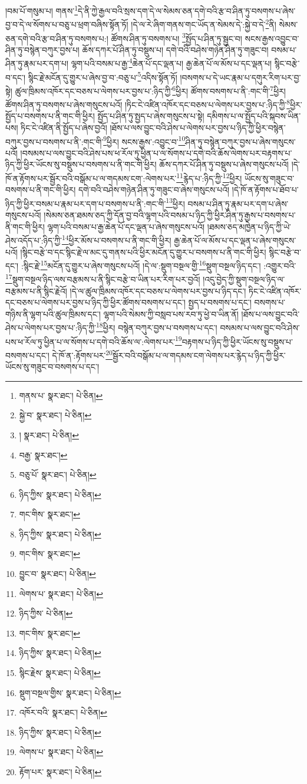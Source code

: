 །བམ་པོ་གསུམ་པ། གནས་\footnote{གནས་པ་  སྣར་ཐང་།  པེ་ཅིན། }དེ་ནི་ཀྱེ་རྒྱལ་བའི་སྲས་དག་དེ་ལ་སེམས་ཅན་དགེ་བའི་རྩ་བ་ཤིན་ཏུ་བསགས་པ་ཞེས་བྱ་བ་དེ་ལ་སོགས་པ་བཅུ་པ་ཕྲག་བཞིས་སྟོན་ཏོ། །དེ་ལ་རེ་ཞིག་གནས་གང་ཡོད་ན་སེམས་དེ་:སྐྱེ་བ་དེ་\footnote{སྐྱེ་བ་  སྣར་ཐང་།  པེ་ཅིན། }ནི། སེམས་ཅན་དགེ་བའི་རྩ་བ་ཤིན་ཏུ་བསགས་པ:། ཚོགས་ཤིན་ཏུ་བསགས་པ། \footnote{།    སྣར་ཐང་།  པེ་ཅིན། }སྤྱོད་པ་ཤིན་ཏུ་སྦྱང་བ། སངས་རྒྱས་འབྱུང་བ་ཤིན་ཏུ་བསྙེན་བཀུར་བྱས་པ། ཆོས་དཀར་པོ་ཤིན་ཏུ་བསྡུས་པ། དགེ་བའི་བཤེས་གཉེན་ཤིན་ཏུ་གཟུང་བ། བསམ་པ་ཤིན་ཏུ་རྣམ་པར་དག་པ། ལྷག་པའི་བསམ་པ་རྒྱ་\footnote{བརྒྱ་  སྣར་ཐང་། }ཆེན་པོ་དང་ལྡན་པ། རྒྱ་ཆེན་པོ་ལ་མོས་པ་དང་ལྡན་པ། སྙིང་བརྩེ་བ་དང་། སྙིང་རྗེ་མངོན་དུ་གྱུར་པ་ཞེས་བྱ་བ་:བཅུ་པ་\footnote{བཅུ་པོ་  སྣར་ཐང་།  པེ་ཅིན། }འདིས་སྟོན་ཏོ། །བསགས་པ་དེ་ཡང་རྣམ་པ་དགུར་རིག་པར་བྱ་སྟེ། ཚུལ་ཁྲིམས་འཁོར་དང་བཅས་པ་ལེགས་པར་བྱས་པ་:ཉིད་ཀྱི་\footnote{ཉིད་ཀྱིས་  སྣར་ཐང་།  པེ་ཅིན། }ཕྱིར། ཚོགས་བསགས་པ་ནི་:གང་གི་\footnote{གང་གིས་  སྣར་ཐང་། }ཕྱིར། ཚོགས་ཤིན་ཏུ་བསགས་པ་ཞེས་གསུངས་པའོ། །ཏིང་ངེ་འཛིན་འཁོར་དང་བཅས་པ་ལེགས་པར་བྱས་པ་:ཉིད་ཀྱི་\footnote{ཉིད་ཀྱིས་  སྣར་ཐང་།  པེ་ཅིན། }ཕྱིར་སྤྱོད་པ་བསགས་པ་ནི་གང་གི་ཕྱིར། སྤྱོད་པ་ཤིན་ཏུ་སྤྱད་པ་ཞེས་གསུངས་པ་སྟེ། དམིགས་པ་ལ་སྤྱོད་པའི་སྐབས་ཡིན་པས། ཏིང་ངེ་འཛིན་ནི་སྤྱོད་པ་ཞེས་བྱའོ། །ཐོས་པ་ལས་བྱུང་བའི་ཤེས་པ་ལེགས་པར་བྱས་པ་ཉིད་ཀྱི་ཕྱིར་བསྙེན་བཀུར་བྱས་པ་བསགས་པ་ནི་:གང་གི་\footnote{གང་གིས་  སྣར་ཐང་། }ཕྱིར། སངས་རྒྱས་:འབྱུང་བ་\footnote{བྱུང་བ་  སྣར་ཐང་།  པེ་ཅིན། }ཤིན་ཏུ་བསྙེན་བཀུར་བྱས་པ་ཞེས་གསུངས་པའོ། །བསམས་པ་ལས་བྱུང་བའི་ཤེས་པས་ཕ་རོལ་ཏུ་ཕྱིན་པ་ལ་སོགས་པ་དགེ་བའི་ཆོས་ལེགས་པར་བརྟགས་པ་ཉིད་ཀྱི་ཕྱིར་ཡོངས་སུ་བསྡུས་པ་བསགས་པ་ནི་གང་གི་ཕྱིར། ཆོས་དཀར་པོ་ཤིན་ཏུ་བསྡུས་པ་ཞེས་གསུངས་པའོ། །དེ་ཁོ་ན་རྟོགས་པར་སྦྱོར་བའི་བསྒོམ་པ་ལ་གདམས་ངག་:ལེགས་པར་\footnote{ལེགས་པ་  སྣར་ཐང་།  པེ་ཅིན། }རྙེད་པ་:ཉིད་ཀྱི་\footnote{ཉིད་ཀྱིས་  པེ་ཅིན། }ཕྱིར། ཡོངས་སུ་གཟུང་བ་བསགས་པ་ནི་གང་གི་ཕྱིར། དགེ་བའི་བཤེས་གཉེན་ཤིན་ཏུ་གཟུང་བ་ཞེས་གསུངས་པའོ། །དེ་ཁོ་ན་རྟོགས་པ་ཐོབ་པ་ཉིད་ཀྱི་ཕྱིར་བསམ་པ་རྣམ་པར་དག་པ་བསགས་པ་ནི་:གང་གི་\footnote{གང་གིས་  སྣར་ཐང་། }ཕྱིར། བསམ་པ་ཤིན་ཏུ་རྣམ་པར་དག་པ་ཞེས་གསུངས་པའོ། །སེམས་ཅན་ཐམས་ཅད་ཀྱི་དོན་བྱ་བའི་ལྷག་པའི་བསམ་པ་ཉིད་ཀྱི་ཕྱིར་ཤིན་ཏུ་རྒྱས་པ་བསགས་པ་ནི་གང་གི་ཕྱིར། ལྷག་པའི་བསམ་པ་རྒྱ་ཆེན་པོ་དང་ལྡན་པ་ཞེས་གསུངས་པའོ། །ཐམས་ཅད་མཁྱེན་པ་ཉིད་ཀྱི་ཡེ་ཤེས་འདོད་པ་:ཉིད་ཀྱི་\footnote{ཉིད་ཀྱིས་  སྣར་ཐང་།  པེ་ཅིན། }ཕྱིར་མོས་པ་བསགས་པ་ནི་གང་གི་ཕྱིར། རྒྱ་ཆེན་པོ་ལ་མོས་པ་དང་ལྡན་པ་ཞེས་གསུངས་པའོ། །སྙིང་བརྩེ་བ་དང་སྙིང་རྗེ་ལ་མང་དུ་གནས་པའི་ཕྱིར་མངོན་དུ་གྱུར་པ་བསགས་པ་ནི་གང་གི་ཕྱིར། སྙིང་བརྩེ་བ་དང་། :སྙིང་རྗེ་\footnote{སྙིང་རྗེས་  སྣར་ཐང་།  པེ་ཅིན། }མངོན་དུ་གྱུར་པ་ཞེས་གསུངས་པའོ། །དེ་ལ་:སྡུག་བསྔལ་གྱི་\footnote{སྡུག་བསྔལ་གྱིས་  སྣར་ཐང་།  པེ་ཅིན། }སྡུག་བསྔལ་ཉིད་དང་། :འགྱུར་བའི་\footnote{འཁོར་བའི་  སྣར་ཐང་།  པེ་ཅིན། }སྡུག་བསྔལ་ཉིད་ལས་བརྩམས་པ་ནི་སྙིང་བརྩེ་བ་ཡིན་པར་རིག་པར་བྱའོ། །འདུ་བྱེད་ཀྱི་སྡུག་བསྔལ་ཉིད་ལ་བརྩམས་པ་ནི་སྙིང་རྗེའོ། །དེ་ལ་ཚུལ་ཁྲིམས་འཁོར་དང་བཅས་པ་ལེགས་པར་བྱས་པ་ཉིད་དང་། ཏིང་ངེ་འཛིན་འཁོར་དང་བཅས་པ་ལེགས་པར་བྱས་པ་ཉིད་ཀྱི་ཕྱིར་ཚོགས་བསགས་པ་དང་། སྤྱད་པ་བསགས་པ་དང་། བསགས་པ་གཉིས་ནི་ལྷག་པའི་ཚུལ་ཁྲིམས་དང་། ལྷག་པའི་སེམས་ཀྱི་བསླབ་པས་རབ་ཏུ་ཕྱེ་བ་ཡིན་ནོ། །ཐོས་པ་ལས་བྱུང་བའི་ཤེས་པ་ལེགས་པར་བྱས་པ་:ཉིད་ཀྱི་\footnote{ཉིད་ཀྱིས་  སྣར་ཐང་།  པེ་ཅིན། }ཕྱིར། བསྙེན་བཀུར་བྱས་པ་བསགས་པ་དང་། བསམས་པ་ལས་བྱུང་བའི་ཤེས་པས་ཕ་རོལ་ཏུ་ཕྱིན་པ་ལ་སོགས་པ་དགེ་བའི་ཆོས་ལ་:ལེགས་པར་\footnote{ལེགས་པ་  སྣར་ཐང་།  པེ་ཅིན། }བརྟགས་པ་ཉིད་ཀྱི་ཕྱིར་ཡོངས་སུ་བསྡུས་པ་བསགས་པ་དང་། དེ་ཁོ་ན་:རྟོགས་པར་\footnote{རྟོག་པར་  སྣར་ཐང་།  པེ་ཅིན། }སྦྱོར་བའི་བསྒོམ་པ་ལ་གདམས་ངག་ལེགས་པར་རྙེད་པ་ཉིད་ཀྱི་ཕྱིར་ཡོངས་སུ་གཟུང་བ་བསགས་པ་དང་། 